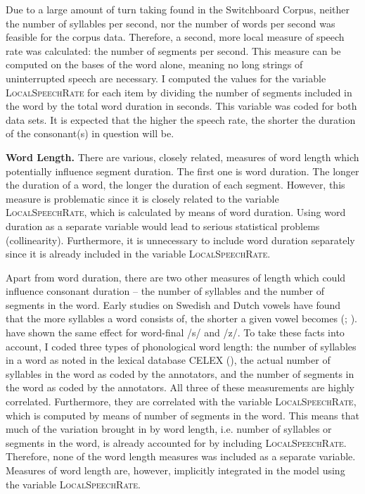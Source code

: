 Due to a large amount of turn taking found in the Switchboard Corpus, neither the number of syllables per second, nor the number of words per second was feasible for the corpus data. Therefore, a second, more local measure of speech rate was calculated: the number of segments per second. This measure can be computed on the bases of the word alone, meaning no long strings of uninterrupted speech are necessary.
I computed the values for the variable \textsc{LocalSpeechRate} for each item by dividing the number of segments included in the word by the total word duration in seconds.  This variable was coded for both data sets.
 It is expected that the higher the speech rate, the shorter the duration of the consonant(s) in question will be.





\textbf{Word Length.} There are various, closely related, measures of word length which potentially influence segment duration. The first one is word duration. The longer the duration of a word, the longer the duration of each segment. However, this measure is problematic since it is closely related to the variable \textsc{LocalSpeechRate}, which is calculated by means of word duration. Using word duration as a separate variable would lead to serious statistical problems (collinearity). Furthermore, it is unnecessary to include word duration separately since it is already included in the variable \textsc{LocalSpeechRate}.

Apart from word duration, there are two other measures of length which could influence consonant duration --  the number of syllables and the number of segments in the word.  Early studies on Swedish and Dutch vowels have found that the more syllables a word consists of, the shorter a given vowel becomes (\citealt{Lindblom.1963}; \citealt{Nooteboom.1972}). \citet{Plag.2017} have shown the same effect for word-final  /s/ and /z/. To take these facts into account, I coded three types of phonological word length: the number of syllables in a word as noted in the lexical database CELEX (\citealt{Baayen.1995}), the actual number of syllables in the word as coded by the annotators, and the number of segments in the word as coded by the annotators. All three of these measurements are highly correlated. Furthermore, they are correlated with the variable \textsc{LocalSpeechRate}, which is computed by means of number of segments in the word. This means that much of the variation brought in by word length, i.e. number of syllables or segments in the word, is already accounted for by including \textsc{LocalSpeechRate}. Therefore, none of the word length measures was included as a separate variable. Measures of word length are, however, implicitly integrated in the model using the variable \textsc{LocalSpeechRate}.

